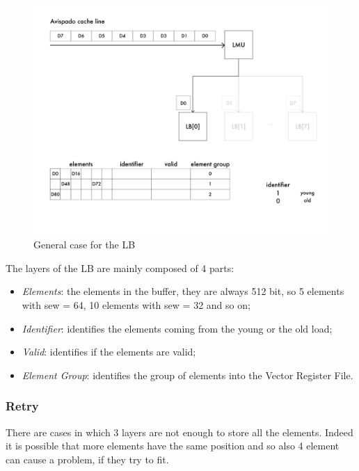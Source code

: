 \begin{figure}[H]
    \centering
    \includegraphics[scale = 0.4]{Chapter_2/img/cache-to-lb-genz-ex.png}
    \caption{General case for the LB}
    \label{lb-genz}
\end{figure}

The layers of the LB are mainly composed of 4 parts:
\begin{itemize}
    \item \emph{Elements}: the elements in the buffer, they are always 512 bit, so 5 elements with sew = 64, 10 elements with sew = 32 and so on;
    
    \item \emph{Identifier}: identifies the elements coming from the young or the old load;
    
    \item \emph{Valid}: identifies if the elements are valid;
    
    \item \emph{Element Group}: identifies the group of elements into the Vector Register File. 
\end{itemize}

\subsubsection{Retry}
There are cases in which 3 layers are not enough to store all the elements. Indeed it is possible that more elements have the same position and so also 4 element can cause a problem, if they try to fit.\\

